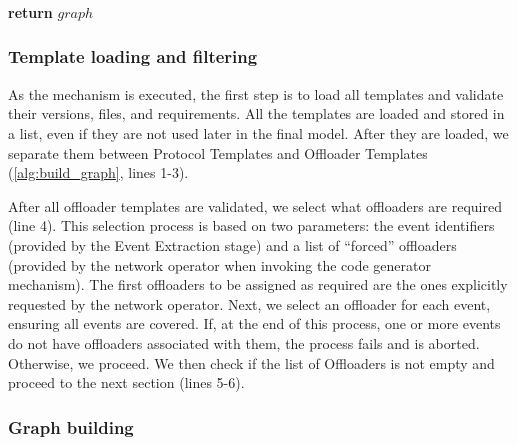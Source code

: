 \begin{algorithm}[htb]
     \\
    
    \vspace{1em}
            
     \\
     \\
     \\
     \\
    
    \vspace{1em}
            
    \textbf{return} $graph$  \\
\end{algorithm}


\subsubsection*{Template loading and filtering}

As the mechanism is executed, the first step is to load all templates and validate their versions, files, and requirements. All the templates are loaded and stored in a list, even if they are not used later in the final model. After they are loaded, we separate them between Protocol Templates and Offloader Templates (\autoref{alg:build_graph}, lines 1-3).

After all offloader templates are validated, we select what offloaders are required (line 4). This selection process is based on two parameters: the event identifiers (provided by the Event Extraction stage) and a list of ``forced'' offloaders (provided by the network operator when invoking the code generator mechanism). The first offloaders to be assigned as required are the ones explicitly requested by the network operator. Next, we select an offloader for each event, ensuring all events are covered. If, at the end of this process, one or more events do not have offloaders associated with them, the process fails and is aborted. Otherwise, we proceed. We then check if the list of Offloaders is not empty and proceed to the next section (lines 5-6).

\subsubsection*{Graph building}

